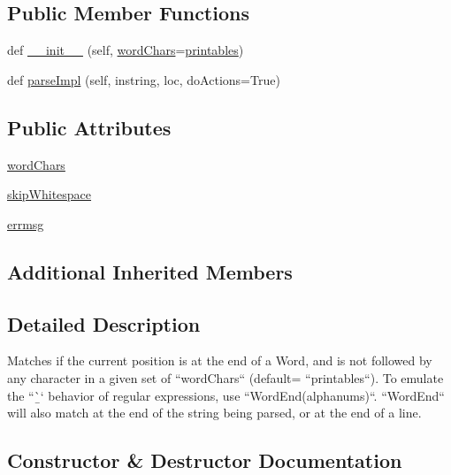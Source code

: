 \subsection*{Public Member Functions}
\begin{DoxyCompactItemize}
\item 
def \hyperlink{classpyparsing_1_1WordEnd_a5e96af4fabdc9bbaab63caf2be8b258a}{\+\_\+\+\_\+init\+\_\+\+\_\+} (self, \hyperlink{classpyparsing_1_1WordEnd_a808f988e128a97d3d03b0e22160241fe}{word\+Chars}=\hyperlink{namespacepyparsing_ad8c4f09cc517099e759be4c94403f9b4}{printables})
\item 
def \hyperlink{classpyparsing_1_1WordEnd_a1bf77087de10cf32ae3837a0758d166c}{parse\+Impl} (self, instring, loc, do\+Actions=True)
\end{DoxyCompactItemize}
\subsection*{Public Attributes}
\begin{DoxyCompactItemize}
\item 
\hyperlink{classpyparsing_1_1WordEnd_a808f988e128a97d3d03b0e22160241fe}{word\+Chars}
\item 
\hyperlink{classpyparsing_1_1WordEnd_af90e150ab8a4cceb091aba0d707f204e}{skip\+Whitespace}
\item 
\hyperlink{classpyparsing_1_1WordEnd_ab6fd7454a05f4dacd080f5301b7a9e99}{errmsg}
\end{DoxyCompactItemize}
\subsection*{Additional Inherited Members}


\subsection{Detailed Description}
\begin{DoxyVerb}Matches if the current position is at the end of a Word, and is
not followed by any character in a given set of ``wordChars``
(default= ``printables``). To emulate the ``\b`` behavior of
regular expressions, use ``WordEnd(alphanums)``. ``WordEnd``
will also match at the end of the string being parsed, or at the end
of a line.
\end{DoxyVerb}
 

\subsection{Constructor \& Destructor Documentation}
\mbox{\label{classpyparsing_1_1WordEnd_a5e96af4fabdc9bbaab63caf2be8b258a}} 
